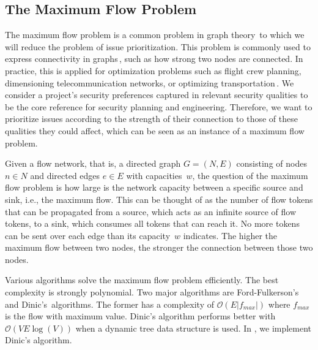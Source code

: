 \subsection{The Maximum Flow Problem}
\noindent
The maximum flow problem is a common problem in graph theory\,\cite{harris1955} to which we will reduce the problem of issue prioritization.
This problem is commonly used to express connectivity in graphs\,\cite{Esfahanian2013}, such as how strong two nodes are connected.
In practice, this is applied for optimization problems such as flight crew planning, dimensioning telecommunication networks, or optimizing transportation\,\cite{Feng2012}.
We consider a project's security preferences captured in relevant security qualities to be the core reference for security planning and engineering.
Therefore, we want to prioritize issues according to the strength of their connection to those of these qualities they could affect, which can be seen as an instance of a maximum flow problem.

Given a flow network, that is, a directed graph $G = (N,E)$ consisting of nodes $n \in N$ and directed edges $e \in E$ with capacities~$w$, the question of the maximum flow problem is how large is the network capacity between a specific source and sink, i.e., the maximum flow.
This can be thought of as the number of flow tokens that can be propagated from a source, which acts as an infinite source of flow tokens, to a sink, which consumes all tokens that can reach it.
No more tokens can be sent over each edge than its capacity~$w$ indicates.
The higher the maximum flow between two nodes, the stronger the connection between those two nodes.

Various algorithms solve the maximum flow problem efficiently.
The best complexity is strongly polynomial.
Two major algorithms %
are Ford-Fulkerson's\,\cite{ford_fulkerson_1956} and Dinic's\,\cite{dinic1970algorithm} algorithms.
The former has a complexity of $\mathcal{O}(E|f_{max}|)$ where $f_{max}$ is the flow with maximum value.
Dinic's algorithm performs better with $\mathcal{O}(VE\log(V))$ when a dynamic tree data structure is used.
In \appr{}, we implement Dinic’s algorithm.